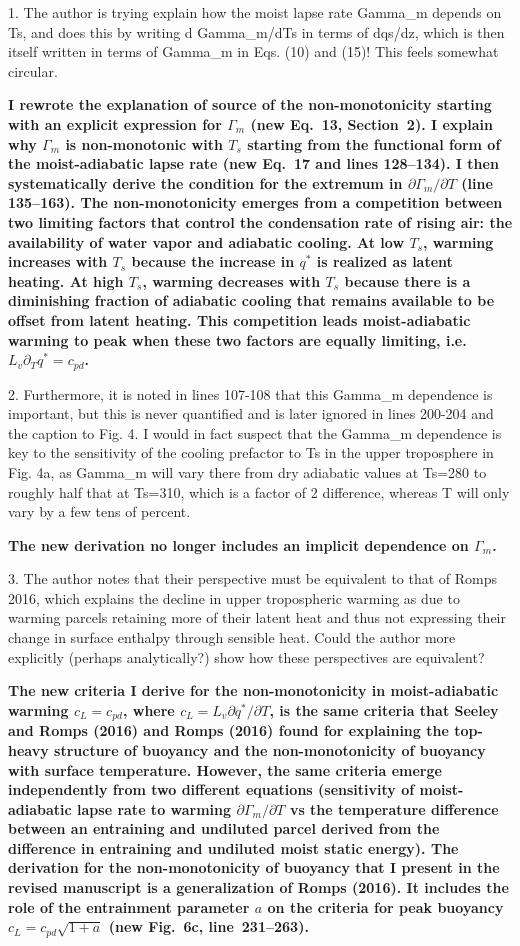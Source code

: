 \documentclass{article}
\begin{document}
1. The author is trying explain how the moist lapse rate Gamma\_m depends on Ts, and does this by writing d Gamma\_m/dTs in terms of dqs/dz, which is then itself written in terms of  Gamma\_m in Eqs. (10) and (15)! This feels somewhat circular.
\par
\textbf{I rewrote the explanation of source of the non-monotonicity starting with an explicit expression for $\Gamma_m$ (new Eq.~13, Section~2). I explain why $\Gamma_m$ is non-monotonic with $T_s$ starting from the functional form of the moist-adiabatic lapse rate (new Eq.~17 and lines 128--134). I then systematically derive the condition for the extremum in $\partial\Gamma_m/\partial T$ (line 135--163). The non-monotonicity emerges from a competition between two limiting factors that control the condensation rate of rising air: the availability of water vapor and adiabatic cooling. At low $T_s$, warming increases with $T_s$ because the increase in $q^*$ is realized as latent heating. At high $T_s$, warming decreases with $T_s$ because there is a diminishing fraction of adiabatic cooling that remains available to be offset from latent heating. This competition leads moist-adiabatic warming to peak when these two factors are equally limiting, i.e. $L_v \partial_T q^* = c_{pd}$.}
\par
2. Furthermore, it is noted in lines 107-108 that this Gamma\_m dependence is important, but this is never quantified and is later ignored in lines 200-204 and the caption to Fig. 4. I would in fact suspect that the Gamma\_m dependence is key to the sensitivity of the cooling prefactor to Ts in the upper troposphere in Fig. 4a, as  Gamma\_m will vary there from dry adiabatic values at Ts=280 to roughly half that at Ts=310, which is a factor of 2 difference, whereas T will only vary by a few tens of percent.
\par
\textbf{The new derivation no longer includes an implicit dependence on $\Gamma_m$.}
\par
3. The author notes that their perspective must be equivalent to that of Romps 2016, which explains the decline in upper tropospheric warming as due to warming parcels retaining more of their latent heat and thus not expressing their change in surface enthalpy through sensible heat. Could the author more explicitly (perhaps analytically?) show how these perspectives are equivalent?
\par
\textbf{The new criteria I derive for the non-monotonicity in moist-adiabatic warming $c_L=c_{pd}$, where $c_L=L_v\partial q^* / \partial T$, is the same criteria that Seeley and Romps (2016) and Romps (2016) found for explaining the top-heavy structure of buoyancy and the non-monotonicity of buoyancy with surface temperature. However, the same criteria emerge independently from two different equations (sensitivity of moist-adiabatic lapse rate to warming $\partial \Gamma_m / \partial T$ vs the temperature difference between an entraining and undiluted parcel derived from the difference in entraining and undiluted moist static energy). The derivation for the non-monotonicity of buoyancy that I present in the revised manuscript is a generalization of Romps (2016). It includes the role of the entrainment parameter $a$ on the criteria for peak buoyancy $c_L=c_{pd}\sqrt{1+a}$ (new Fig.~6c, line~231--263).}
\end{document}
